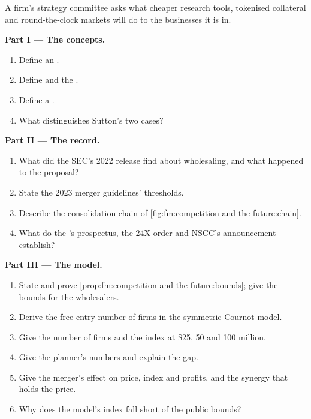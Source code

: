 \begin{problem}\label{pb:fm:competition-and-the-future:1}
A firm's strategy committee asks what cheaper research tools, tokenised collateral and round-the-clock markets will do to the businesses it is in.

\medskip\noindent\textbf{Part I --- The concepts.}
\begin{enumerate}
\item Define an .
\item Define  and the .
\item Define a .
\item What distinguishes Sutton's two cases?
\end{enumerate}

\medskip\noindent\textbf{Part II --- The record.}
\begin{enumerate}[resume]
\item What did the SEC's 2022 release find about wholesaling, and what happened to the proposal?
\item State the 2023 merger guidelines' thresholds.
\item Describe the consolidation chain of \cref{fig:fm:competition-and-the-future:chain}.
\item What do the 's prospectus, the 24X order and NSCC's announcement establish?
\end{enumerate}

\medskip\noindent\textbf{Part III --- The model.}
\begin{enumerate}[resume]
\item State and prove \cref{prop:fm:competition-and-the-future:bounds}; give the bounds for the wholesalers.
\item Derive the free-entry number of firms in the symmetric Cournot model.
\item Give the number of firms and the index at \$25, 50 and 100 million.
\item Give the planner's numbers and explain the gap.
\item Give the merger's effect on price, index and profits, and the synergy that holds the price.
\item Why does the model's index fall short of the public bounds?
\end{enumerate}


\end{problem}
